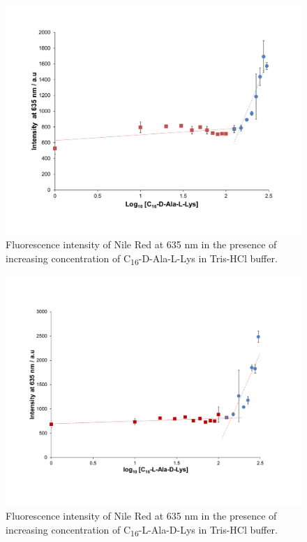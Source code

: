 \begin{figure} [ht!]
\centering
\includegraphics[scale=0.45]{Nile_Red_Assays/Nile_Red_Assay_KAT1_22.pdf}
\caption{Fluorescence intensity of Nile Red at 635 nm  in the presence of increasing concentration of C\textsubscript{16}-D-Ala-L-Lys in Tris-HCl buffer.}
\label{NR_KAT1.22}
\end{figure}

\begin{figure} [ht!]
\centering
\includegraphics[scale=0.45]{Nile_Red_Assays/Nile_Red_Assay_KAT1_30.pdf}
\caption{Fluorescence intensity of Nile Red at 635 nm  in the presence of increasing concentration of C\textsubscript{16}-L-Ala-D-Lys in Tris-HCl buffer.}
\label{NR_KAT1.30}
\end{figure}
\newpage

